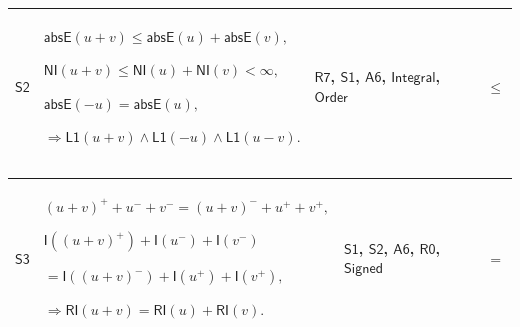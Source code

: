 \documentclass[11pt]{amsart}
\newlength{\FTCFourColumnBody}
\begin{document}
{\begin{tabular}
\end{tabular}%
\par\setlength{\parskip}{0pt}\nointerlineskip
\noindent
\begin{tabular}{|@{}>{\centering\arraybackslash}m{0.078431\FTCFourColumnBody}|>{\centering\arraybackslash}m{0.535947\FTCFourColumnBody}|>{\centering\arraybackslash}m{0.281045\FTCFourColumnBody}|>{\centering\arraybackslash}m{0.104575\FTCFourColumnBody}|}\hline
\hypertarget{dct:S2}{$\displaystyle \textsf{S2}$} & $\displaystyle \textsf{absE}(u+v)\le\textsf{absE}(u)+\textsf{absE}(v),$\par
$\displaystyle \textsf{NI}(u+v)\le\textsf{NI}(u)+\textsf{NI}(v)<\infty,$\par
$\displaystyle \textsf{absE}(-u)=\textsf{absE}(u),$\par
$\displaystyle \Rightarrow\textsf{L1}(u+v)\land\textsf{L1}(-u)\land\textsf{L1}(u-v).$ & \hyperlink{dct:R7}{$\displaystyle \textsf{R7}$}, \hyperlink{dct:S1}{$\displaystyle \textsf{S1}$}, \hyperlink{dct:A6}{$\displaystyle \textsf{A6}$}, \hyperlink{lem:Integral}{$\displaystyle \textsf{Integral}$}, \hyperlink{ax:Order}{$\displaystyle \textsf{Order}$} & $\displaystyle \le$\\ \hline
\end{tabular}%
\par\setlength{\parskip}{0pt}\nointerlineskip
\noindent
\begin{tabular}{|@{}>{\centering\arraybackslash}m{0.078431\FTCFourColumnBody}|>{\centering\arraybackslash}m{0.535947\FTCFourColumnBody}|>{\centering\arraybackslash}m{0.281045\FTCFourColumnBody}|>{\centering\arraybackslash}m{0.104575\FTCFourColumnBody}|}\hline
\hypertarget{dct:S3}{$\displaystyle \textsf{S3}$} & $\displaystyle (u+v)^++u^-+v^-=(u+v)^-+u^++v^+,$\par
$\displaystyle \textsf{I}((u+v)^+)+\textsf{I}(u^-)+\textsf{I}(v^-)$\par
$\displaystyle {}=\textsf{I}((u+v)^-)+\textsf{I}(u^+)+\textsf{I}(v^+),$\par
$\displaystyle \Rightarrow\textsf{RI}(u+v)=\textsf{RI}(u)+\textsf{RI}(v).$ & \hyperlink{dct:S1}{$\displaystyle \textsf{S1}$}, \hyperlink{dct:S2}{$\displaystyle \textsf{S2}$}, \hyperlink{dct:A6}{$\displaystyle \textsf{A6}$}, \hyperlink{dct:R0}{$\displaystyle \textsf{R0}$}, \hyperlink{dctdef:Signed}{$\displaystyle \textsf{Signed}$} & $\displaystyle =$\\ \hline
\end{tabular}%
\par\setlength{\parskip}{0pt}\nointerlineskip
}
\end{document}
